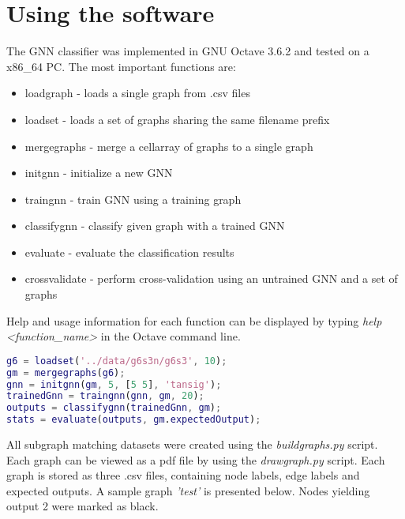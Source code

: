 
\chapter{Using the software\label{chapter:using}}
\noindent The GNN classifier was implemented in GNU Octave 3.6.2 and tested on a x86\_64 PC. The most important functions are:
\begin{itemize}
	\item loadgraph - loads a single graph from .csv files
	\item loadset - loads a set of graphs sharing the same filename prefix
	\item mergegraphs - merge a cellarray of graphs to a single graph
	\item initgnn - initialize a new GNN
	\item traingnn - train GNN using a training graph
	\item classifygnn - classify given graph with a trained GNN
	\item evaluate - evaluate the classification results
	\item crossvalidate - perform cross-validation using an untrained GNN and a set of graphs
\end{itemize}
\noindent Help and usage information for each function can be displayed by typing \emph{help <function\_name>} in the Octave command line.\\



\begin{lstlisting}[style=outcode, language=Matlab, caption=Sample usage session]
g6 = loadset('../data/g6s3n/g6s3', 10);
gm = mergegraphs(g6);
gnn = initgnn(gm, 5, [5 5], 'tansig');
trainedGnn = traingnn(gnn, gm, 20);
outputs = classifygnn(trainedGnn, gm);
stats = evaluate(outputs, gm.expectedOutput);
\end{lstlisting}

\noindent All subgraph matching datasets were created using the \emph{buildgraphs.py} script. Each graph can be viewed as a pdf file by using the \emph{drawgraph.py} script. Each graph is stored as three .csv files, containing node labels, edge labels and expected outputs. A sample graph \emph{'test'} is presented below. Nodes yielding output 2 were marked as black.

\begin{figure}
\begin{floatrow}
\end{floatrow}
\end{figure}
